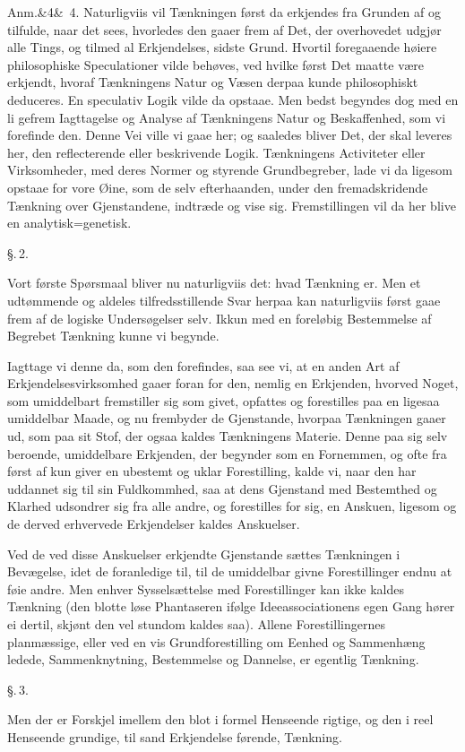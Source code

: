 \documentclass[12pt]{book}
\def\sperr#1{#1}%
\def\textit#1{#1}%
\def\emph#1{#1}%
\newcommand{\sperr}[1]{\textls[180]{#1}}
\newcommand{\parag}[1]{%
  \par\vspace{0.9\baselineskip}%
  {\centering\textit{\S.\,#1.}\par}%
  \vspace{0.35\baselineskip}%
  \noindent\hspace{\parindent}\ignorespaces
}
\newcommand{\anm}[1]{%
  \par\vspace{0.5\baselineskip}%
  \noindent\hspace{\parindent}\sperr{Anm.}\ifx&#1&\else~\textit{#1}.\fi
  \enspace\ignorespaces
}
\newcommand{\opage}[1]{\marginnote{\footnotesize\textit{[#1]}}}
\begin{document}
\anm{4} Naturligviis vil Tænkningen først da erkjendes fra Grunden af og
tilfulde, naar det sees, hvorledes den gaaer frem af Det, der overhovedet
udgjør alle Tings, og tilmed al Erkjendelses, sidste Grund. Hvortil
foregaaende høiere philosophiske Speculationer vilde behøves, ved hvilke først
Det maatte være erkjendt, hvoraf Tænkningens Natur og Væsen derpaa kunde
philosophiskt deduceres. En speculativ Logik vilde da opstaae. Men bedst
begyndes dog med en li%
\opage{5}gefrem Iagttagelse og Analyse af Tænkningens Natur og Beskaffenhed, som vi
forefinde den. Denne Vei ville vi gaae her; og saaledes bliver Det, der skal
leveres her, den reflecterende eller beskrivende Logik. Tænkningens
Activiteter eller Virksomheder, med deres Normer og styrende Grundbegreber,
lade vi da ligesom opstaae for vore Øine, som de selv efterhaanden, under den
fremadskridende Tænkning over Gjenstandene, indtræde og vise sig.
Fremstillingen vil da her blive en analytisk=genetisk.
\parag{2}
Vort første Spørsmaal bliver nu naturligviis det: hvad Tænkning er. Men et
udtømmende og aldeles tilfredsstillende Svar herpaa kan naturligviis først
gaae frem af de logiske Undersøgelser selv. Ikkun med en foreløbig Bestemmelse
af Begrebet Tænkning kunne vi begynde.

Iagttage vi denne da, som den forefindes, saa see vi, at en anden Art af
Erkjendelsesvirksomhed gaaer foran for den, nemlig en Erkjenden, hvorved
Noget, som umiddelbart fremstiller sig som givet, opfattes og forestilles paa
en ligesaa umiddelbar Maade, og nu frembyder de Gjenstande, hvorpaa Tænkningen
\emph{gaaer ud}, som paa sit \emph{Stof}, der ogsaa kaldes Tænkningens
\emph{Materie}. Denne paa sig selv beroende, umiddelbare \emph{Erkjenden}, der
begynder som en \emph{Fornemmen}, og ofte fra først af kun giver en ubestemt og
uklar Forestilling, kalde vi, naar den har uddannet
\opage{6} sig til sin Fuldkommhed, saa at dens Gjenstand med Bestemthed og Klarhed
udsondrer sig fra alle andre, og forestilles for sig, en \emph{Anskuen},
ligesom og de derved erhvervede Erkjendelser kaldes \emph{Anskuelser}.

Ved de ved disse Anskuelser erkjendte Gjenstande sættes Tænkningen i
Bevægelse, idet de foranledige til, til de umiddelbar givne Forestillinger
endnu at føie andre. Men enhver Sysselsættelse med Forestillinger kan ikke
kaldes Tænkning (den blotte løse Phantaseren ifølge Ideeassociationens egen
Gang hører ei dertil, skjønt den vel stundom kaldes saa). Allene
Forestillingernes planmæssige, eller ved en vis Grundforestilling om Eenhed og
Sammenhæng ledede, Sammenknytning, Bestemmelse og Dannelse, er egentlig
Tænkning.
\parag{3}
Men der er Forskjel imellem den blot i formel \emph{Henseende} rigtige, og den
i reel \emph{Henseende} grundige, til sand Erkjendelse førende, Tænkning.
\end{document}
